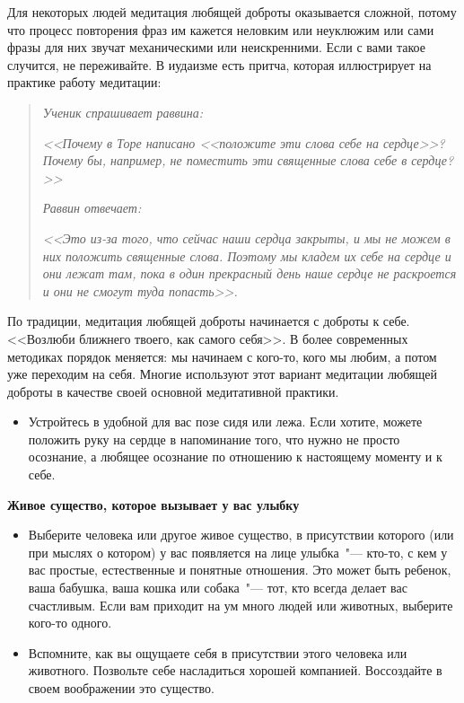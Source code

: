 Для некоторых людей медитация любящей доброты оказывается сложной, потому что процесс повторения фраз им кажется неловким или неуклюжим или сами фразы для них звучат механическими или неискренними. Если с вами такое случится, не переживайте. В иудаизме есть притча, которая иллюстрирует на практике работу медитации:

\begin{quotation}
	\textit{Ученик спрашивает раввина:}
	
	\textit{
		<<Почему в Торе написано <<положите эти слова себе на сердце>>? Почему бы, например, не поместить эти священные слова себе в сердце?>>
	}

	\textit{Раввин отвечает:}
	 
	\textit{
		<<Это из-за того, что сейчас наши сердца закрыты, и мы не можем в них положить священные слова. Поэтому мы кладем их себе на сердце и они лежат там, пока в один прекрасный день наше сердце не раскроется и они не смогут туда попасть>>.
	}\cite{71}
\end{quotation}

\newpage
{} \label{M:Loving-Kindness_for_a_Loved_One}

По традиции, медитация любящей доброты начинается с доброты к себе. <<Возлюби ближнего твоего, как самого себя>>. В более современных методиках порядок меняется: мы начинаем с кого-то, кого мы любим, а потом уже переходим на себя. Многие используют этот вариант медитации любящей доброты в качестве своей основной медитативной практики.

\begin{itemize}
	\item Устройтесь в удобной для вас позе сидя или лежа. Если хотите, можете положить руку на сердце в напоминание того, что нужно не просто осознание, а любящее осознание по отношению к настоящему моменту и к себе. 
\end{itemize}

\vspace{3ex}

{\large \textbf{Живое существо, которое вызывает у вас улыбку}}
\begin{itemize}
	\item Выберите человека или другое живое существо, в присутствии которого (или при мыслях о котором) у вас появляется на лице улыбка~"--- кто-то, с кем у вас простые, естественные и понятные отношения. Это может быть ребенок, ваша бабушка, ваша кошка или собака~"--- тот, кто всегда делает вас счастливым. Если вам приходит на ум много людей или животных, выберите кого-то одного.
	
	\item Вспомните, как вы ощущаете себя в присутствии этого человека или животного. Позвольте себе насладиться хорошей компанией. Воссоздайте в своем воображении это существо.
\end{itemize}

